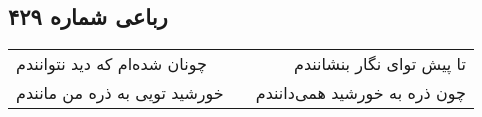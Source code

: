 \begin{center}
\section*{رباعی شماره ۴۲۹}
\label{sec:sh429}
\begin{longtable}{l p{0.5cm} r}
چونان شده‌ام که دید نتوانندم
&&
تا پیش توای نگار بنشانندم
\\
خورشید تویی به ذره من مانندم
&&
چون ذره به خورشید همی‌دانندم
\\
\end{longtable}
\end{center}
